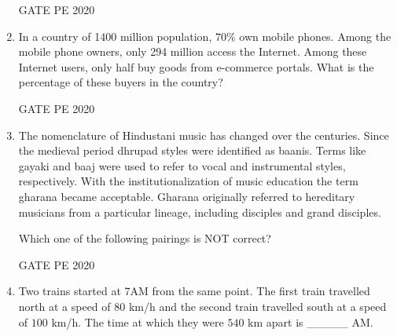 \documentclass[journal,12pt,onecolumn]{IEEEtran}
\theoremstyle{remark}
\begin{document}
\begin{enumerate}
\begin{enumerate}
    \end{enumerate}
   
      \hfill{GATE PE 2020}
    \item In a country of 1400 million population, $70\%$ own mobile phones. Among the mobile phone owners, only 294 million access the Internet. Among these Internet users, only half buy goods from e-commerce portals. What is the percentage of these buyers in the country?
    \begin{enumerate}  \end{enumerate}
   
      \hfill{GATE PE 2020}
      
    \item The nomenclature of Hindustani music has changed over the centuries. Since the medieval period dhrupad styles were identified as baanis. Terms like gayaki and baaj were used to refer to vocal and instrumental styles, respectively. With the institutionalization of music education the term gharana became acceptable. Gharana originally referred to hereditary musicians from a particular lineage, including disciples and grand disciples.
    
    Which one of the following pairings is NOT correct?
    \begin{enumerate}  \end{enumerate}
   
      \hfill{GATE PE 2020}
    
    \item Two trains started at 7AM from the same point. The first train travelled north at a speed of $80$ km/h and the second train travelled south at a speed of $100$ km/h. The time at which they were $540$ km apart is \_\_\_\_\_ AM.
    \begin{enumerate}  \end{enumerate}
    

\end{enumerate}
\end{document}
